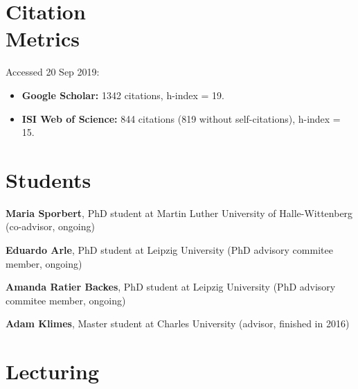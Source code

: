 \HRule

\section{Citation \\ Metrics}

Accessed 20 Sep 2019:

\begin{itemize}
\item \textbf{Google Scholar:} 1342 citations, h-index  = 19.
\item \textbf{ISI Web of Science:} 844 citations (819 without self-citations), h-index = 15.
\end{itemize}


\HRule

\section{Students}

\begin{innerlist}

\item[]{\bf Maria Sporbert}, PhD student at Martin Luther University of Halle-Wittenberg (co-advisor, ongoing)

\item[]{\bf Eduardo Arle}, PhD student at Leipzig University (PhD advisory commitee member, ongoing)

\item[]{\bf Amanda Ratier Backes}, PhD student at Leipzig University (PhD advisory commitee member, ongoing)

\medskip

\item[]{\bf Adam Klimes}, Master student at Charles University (advisor, finished in 2016)

\end{innerlist}

\HRule

\section{Lecturing}

